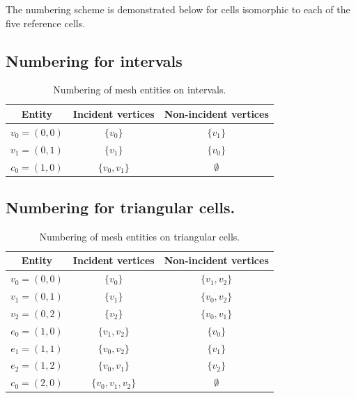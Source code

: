 The numbering scheme is demonstrated below for cells
isomorphic to each of the five reference cells.

\subsection{Numbering for intervals}

\begin{table}[H]
\linespread{1.2}\selectfont
  \begin{center}
    \begin{tabular}{|c|c|c|}
      \hline
      Entity & Incident vertices & Non-incident vertices \\
      \hline
      \hline
      $v_0 = (0, 0)$ & $\{v_0\}$ & $\{v_1\}$ \\
      \hline
      $v_1 = (0, 1)$ & $\{v_1\}$ & $\{v_0\}$ \\
      \hline
      $c_0 = (1, 0)$ & $\{v_0, v_1\}$ & $\emptyset$ \\
      \hline
    \end{tabular}
    \caption{Numbering of mesh entities on intervals.}
    \label{tab:interval,entities}
  \end{center}
\end{table}

\subsection{Numbering for triangular cells.}

\begin{table}[H]
\linespread{1.2}\selectfont
  \begin{center}
    \begin{tabular}{|c|c|c|}
      \hline
      Entity & Incident vertices & Non-incident vertices \\
      \hline
      \hline
      $v_0 = (0, 0)$ & $\{v_0\}$ & $\{v_1, v_2\}$ \\
      \hline
      $v_1 = (0, 1)$ & $\{v_1\}$ & $\{v_0, v_2\}$ \\
      \hline
      $v_2 = (0, 2)$ & $\{v_2\}$ & $\{v_0, v_1\}$ \\
      \hline
      $e_0 = (1, 0)$ & $\{v_1, v_2\}$ & $\{v_0\}$ \\
      \hline
      $e_1 = (1, 1)$ & $\{v_0, v_2\}$ & $\{v_1\}$ \\
      \hline
      $e_2 = (1, 2)$ & $\{v_0, v_1\}$ & $\{v_2\}$ \\
      \hline
      $c_0 = (2, 0)$ & $\{v_0, v_1, v_2\}$ & $\emptyset$ \\
      \hline
    \end{tabular}
    \caption{Numbering of mesh entities on triangular cells.}
    \label{tab:triangle,entities}
  \end{center}
\end{table}

